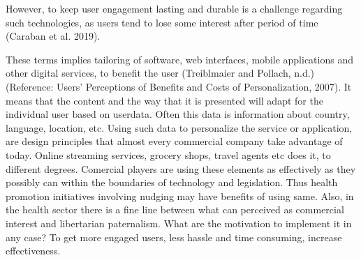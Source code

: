 

However, to keep user engagement lasting  and durable is a challenge regarding such technologies, as users tend to lose some interest after period of time (Caraban et al. 2019).

These terms implies tailoring of software, web interfaces, mobile applications and other digital services, to benefit the user (Treiblmaier and Pollach, n.d.) (Reference: Users' Perceptions of Benefits and Costs of Personalization, 2007). It means that the content and the way that it is presented will adapt for the individual user based on userdata. Often this data is information about country, language, location, etc. Using such data to personalize the service or application, are design principles that almost every commercial company take advantage of today. Online streaming services, grocery shops, travel agents etc does it, to different degrees. Comercial players are using these elements as effectively as they possibly can within the boundaries of technology and legislation. Thus health promotion initiatives involving nudging may have benefits of using same. Also, in the health sector there is a fine line between what can perceived as commercial interest and libertarian paternalism. What are the motivation to implement it in any case? To get more engaged users, less hassle and time consuming, increase effectiveness. 

